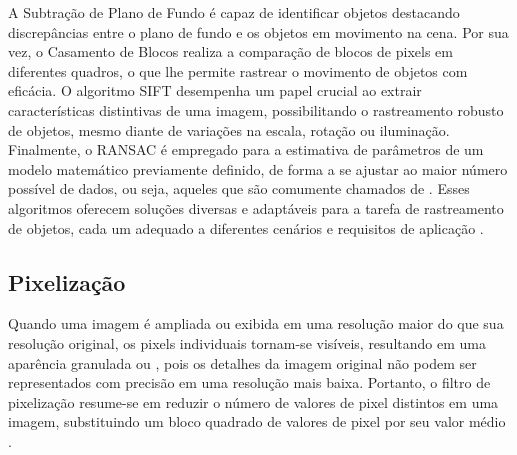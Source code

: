 A Subtração de Plano de Fundo é capaz de identificar objetos destacando discrepâncias entre o plano de fundo e os objetos em movimento na cena. Por sua vez, o Casamento de Blocos realiza a comparação de blocos de pixels em diferentes quadros, o que lhe permite rastrear o movimento de objetos com eficácia. O algoritmo \ac{SIFT} desempenha um papel crucial ao extrair características distintivas de uma imagem, possibilitando o rastreamento robusto de objetos, mesmo diante de variações na escala, rotação ou iluminação. Finalmente, o \ac{RANSAC} é empregado para a estimativa de parâmetros de um modelo matemático previamente definido, de forma a se ajustar ao maior número possível de dados, ou seja, aqueles que são comumente chamados de . Esses algoritmos oferecem soluções diversas e adaptáveis para a tarefa de rastreamento de objetos, cada um adequado a diferentes cenários e requisitos de aplicação \cite{tracking-algoritimo}.











\subsection[Pixelização]{Pixelização}

Quando uma imagem é ampliada ou exibida em uma resolução maior do que sua resolução original, os pixels individuais tornam-se visíveis, resultando em uma aparência granulada ou , pois os detalhes da imagem original não podem ser representados com precisão em uma resolução mais baixa. Portanto, o filtro de pixelização resume-se em reduzir o número de valores de pixel distintos em uma imagem, substituindo um bloco quadrado de valores de pixel por seu valor médio \cite{pixelizacao}. 

